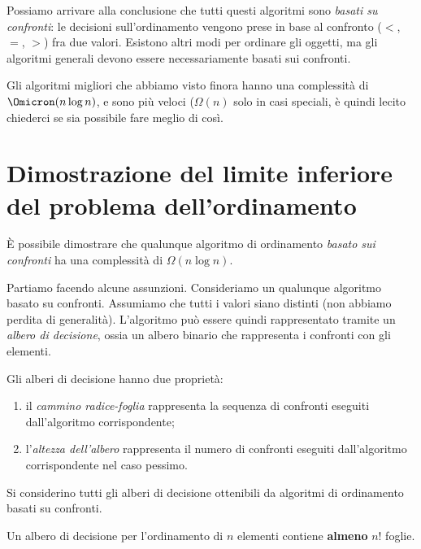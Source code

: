 Possiamo arrivare alla conclusione che tutti questi algoritmi sono \emph{basati su confronti}: le decisioni sull'ordinamento vengono prese in base al confronto (\(<\), \(=\), \(>\)) fra due valori.
Esistono altri modi per ordinare gli oggetti, ma gli algoritmi generali devono essere necessariamente basati sui confronti.

Gli algoritmi migliori che abbiamo visto finora hanno una complessità di \(\Omicron(n \log n)\), \insertionSort e \shellSort sono più veloci (\(\Omega(n)\) solo in casi speciali, è quindi lecito chiederci se sia possibile fare meglio di così.

\section*{Dimostrazione del limite inferiore del problema dell'ordinamento}

\`E possibile dimostrare che qualunque algoritmo di ordinamento \emph{basato sui confronti} ha una complessità di \(\Omega(n \log n)\).

Partiamo facendo alcune assunzioni.
Consideriamo un qualunque algoritmo basato su confronti.
Assumiamo che tutti i valori siano distinti (non abbiamo perdita di generalità).
L'algoritmo può essere quindi rappresentato tramite un \emph{albero di decisione}, ossia un albero binario che rappresenta i confronti con gli elementi.

%     

Gli alberi di decisione hanno due proprietà:
\begin{enumerate}
    \item il \emph{cammino radice-foglia} rappresenta la sequenza di confronti eseguiti dall'algoritmo corrispondente;
    \item l'\emph{altezza dell'albero} rappresenta il numero di confronti eseguiti dall'algoritmo corrispondente nel caso pessimo.
\end{enumerate}

Si considerino tutti gli alberi di decisione ottenibili da algoritmi di ordinamento basati su confronti.

\begin{lemma}
Un albero di decisione per l'ordinamento di \(n\) elementi contiene \textbf{almeno} \(n!\) foglie.
\end{lemma}

